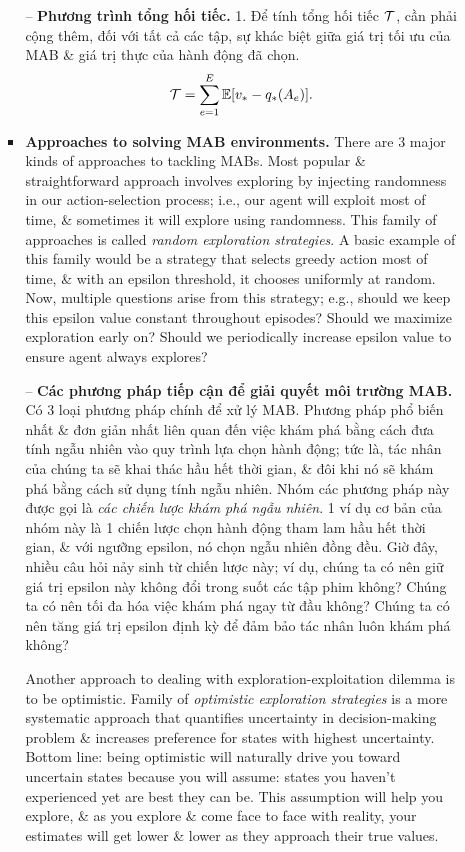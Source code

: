 \documentclass{article}
\begin{document}
\begin{itemize}
\begin{itemize}
\begin{itemize}
            -- {\bf Phương trình tổng hối tiếc.} 1. Để tính tổng hối tiếc $\cal T$, cần phải cộng thêm, đối với tất cả các tập, sự khác biệt giữa giá trị tối ưu của MAB \& giá trị thực của hành động đã chọn.
            \begin{equation*}
                {\cal T} = \sum_{e=1}^E \mathbb{E}[v_* - q_*(A_e)].
            \end{equation*}
            \item {\bf Approaches to solving MAB environments.} There are 3 major kinds of approaches to tackling MABs. Most popular \& straightforward approach involves exploring by injecting randomness in our action-selection process; i.e., our agent will exploit most of time, \& sometimes it will explore using randomness. This family of approaches is called {\it random exploration strategies}. A basic example of this family would be a strategy that selects greedy action most of time, \& with an epsilon threshold, it chooses uniformly at random. Now, multiple questions arise from this strategy; e.g., should we keep this epsilon value constant throughout episodes? Should we maximize exploration early on? Should we periodically increase epsilon value to ensure agent always explores?

            -- {\bf Các phương pháp tiếp cận để giải quyết môi trường MAB.} Có 3 loại phương pháp chính để xử lý MAB. Phương pháp phổ biến nhất \& đơn giản nhất liên quan đến việc khám phá bằng cách đưa tính ngẫu nhiên vào quy trình lựa chọn hành động; tức là, tác nhân của chúng ta sẽ khai thác hầu hết thời gian, \& đôi khi nó sẽ khám phá bằng cách sử dụng tính ngẫu nhiên. Nhóm các phương pháp này được gọi là {\it các chiến lược khám phá ngẫu nhiên}. 1 ví dụ cơ bản của nhóm này là 1 chiến lược chọn hành động tham lam hầu hết thời gian, \& với ngưỡng epsilon, nó chọn ngẫu nhiên đồng đều. Giờ đây, nhiều câu hỏi nảy sinh từ chiến lược này; ví dụ, chúng ta có nên giữ giá trị epsilon này không đổi trong suốt các tập phim không? Chúng ta có nên tối đa hóa việc khám phá ngay từ đầu không? Chúng ta có nên tăng giá trị epsilon định kỳ để đảm bảo tác nhân luôn khám phá không?

            Another approach to dealing with exploration-exploitation dilemma is to be optimistic. Family of {\it optimistic exploration strategies} is a more systematic approach that quantifies uncertainty in decision-making problem \& increases preference for states with highest uncertainty. Bottom line: being optimistic will naturally drive you toward uncertain states because you will assume: states you haven't experienced yet are best they can be. This assumption will help you explore, \& as you explore \& come face to face with reality, your estimates will get lower \& lower as they approach their true values.


\end{itemize}
\end{itemize}
\end{itemize}
\end{document}
